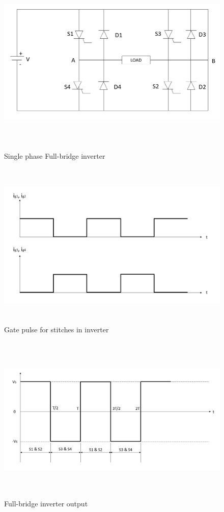 \documentclass[a4paper,12pt]{iitmdiss}
\begin{document}
\begin{figure}[hbt!]
    \centering
    \includegraphics[width = 17.5cm, height = 9cm]{inverter.png}  
    \caption{Single phase Full-bridge inverter}
    \label{fig:3.1}
\end{figure}

\begin{figure}[hbt!]
    \centering
    \includegraphics[width = 15cm, height = 8cm]{gate pusle.png}
    \caption{Gate pulse for stitches in inverter}
    \label{fig:3.2}
\end{figure}

\begin{figure}[hbt!]
    \centering
    \includegraphics[width = 15cm, height = 8cm]{Output_inv.png}
    \caption{Full-bridge inverter output}
    \label{Inverter output}
\end{figure}
\end{document}
